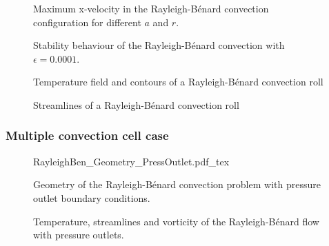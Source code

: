 \begin{figure}[bt]
	\centering
	\pgfplotsset{width=0.31\textwidth, compat=1.3}
	\hspace{0.2cm}
	\caption{Maximum x-velocity in the Rayleigh-Bénard convection configuration for different $a$ and $r$.}
	\label{fig:uvelBFS}
\end{figure}

\begin{figure}
	\centering
	\caption{Stability behaviour of the Rayleigh-Bénard convection with $\epsilon = 0.0001$.}
\end{figure}


\begin{figure}[t]
	\centering
	\pgfplotsset{width=0.31\textwidth, compat=1.3}
	\par\bigskip
	\caption{Temperature field and contours of a Rayleigh-Bénard convection roll}
\end{figure}


\begin{figure}[t]
	\centering
	\pgfplotsset{width=0.31\textwidth, compat=1.3}
	\par\bigskip
	\caption{Streamlines of a Rayleigh-Bénard convection roll}
\end{figure}

\subsubsection{Multiple convection cell case}\label{ssec:MultipleCellConv}



\begin{figure}[bt]
	\begin{center}
		\def\svgwidth{0.93\textwidth}
		{RayleighBen_Geometry_PressOutlet.pdf_tex}
		\caption{Geometry of the Rayleigh-Bénard convection problem with pressure outlet boundary conditions. }
		\label{fig:RayBenGeometry}
	\end{center}
\end{figure}

\begin{figure}[t]
	\centering
	\pgfplotsset{width=0.96\textwidth, compat=1.3}
	\par\bigskip%
	\par\bigskip%
	\caption{Temperature, streamlines and vorticity of the Rayleigh-Bénard flow with pressure outlets.}
\end{figure}
\FloatBarrier